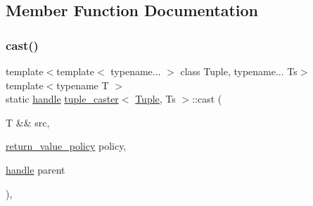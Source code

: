 \subsection{Member Function Documentation}
\mbox{\label{classtuple__caster_ab0a47ea2b14a9771cea035bc44cba5b1}} 
\subsubsection{\texorpdfstring{cast()}{cast()}}
{\footnotesize\ttfamily template$<$template$<$ typename... $>$ class Tuple, typename... Ts$>$ \\
template$<$typename T $>$ \\
static \mbox{\hyperlink{classhandle}{handle}} \mbox{\hyperlink{classtuple__caster}{tuple\+\_\+caster}}$<$ \mbox{\hyperlink{_python-ast_8h_a3f332c0be139cb870e516bad9b6a9366}{Tuple}}, Ts $>$\+::cast (\begin{DoxyParamCaption}\item[{T \&\&}]{src,  }\item[{\mbox{\hyperlink{detail_2common_8h_adde72ab1fb0dd4b48a5232c349a53841}{return\+\_\+value\+\_\+policy}}}]{policy,  }\item[{\mbox{\hyperlink{classhandle}{handle}}}]{parent }\end{DoxyParamCaption})\hspace{0.3cm}{\ttfamily [inline]}, {\ttfamily [static]}}

\mbox{\label{classtuple__caster_a85f19b13b0bfda89d32cdc631b1652c0}} 
